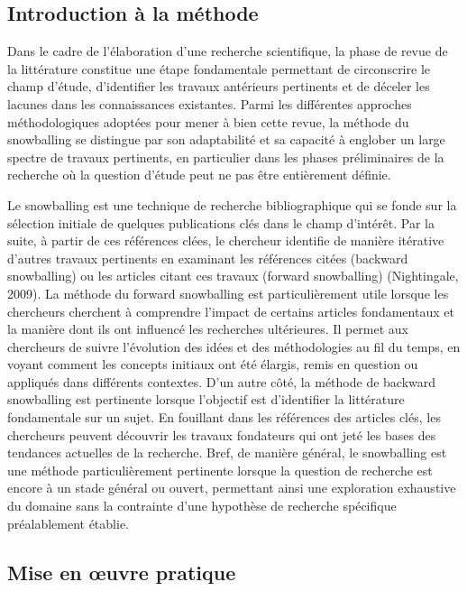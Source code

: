 \documentclass[
  letterpaper,
]{scrbook}
\begin{document}
\hypertarget{introduction-uxe0-la-muxe9thode}{%
\subsection{Introduction à la
méthode}\label{introduction-uxe0-la-muxe9thode}}

Dans le cadre de l'élaboration d'une recherche scientifique, la phase de
revue de la littérature constitue une étape fondamentale permettant de
circonscrire le champ d'étude, d'identifier les travaux antérieurs
pertinents et de déceler les lacunes dans les connaissances existantes.
Parmi les différentes approches méthodologiques adoptées pour mener à
bien cette revue, la méthode du snowballing se distingue par son
adaptabilité et sa capacité à englober un large spectre de travaux
pertinents, en particulier dans les phases préliminaires de la recherche
où la question d'étude peut ne pas être entièrement définie.

Le snowballing est une technique de recherche bibliographique qui se
fonde sur la sélection initiale de quelques publications clés dans le
champ d'intérêt. Par la suite, à partir de ces références clées, le
chercheur identifie de manière itérative d'autres travaux pertinents en
examinant les références citées (backward snowballing) ou les articles
citant ces travaux (forward snowballing) (Nightingale, 2009). La méthode
du forward snowballing est particulièrement utile lorsque les chercheurs
cherchent à comprendre l'impact de certains articles fondamentaux et la
manière dont ils ont influencé les recherches ultérieures. Il permet aux
chercheurs de suivre l'évolution des idées et des méthodologies au fil
du temps, en voyant comment les concepts initiaux ont été élargis, remis
en question ou appliqués dans différents contextes. D'un autre côté, la
méthode de backward snowballing est pertinente lorsque l'objectif est
d'identifier la littérature fondamentale sur un sujet. En fouillant dans
les références des articles clés, les chercheurs peuvent découvrir les
travaux fondateurs qui ont jeté les bases des tendances actuelles de la
recherche. Bref, de manière général, le snowballing est une méthode
particulièrement pertinente lorsque la question de recherche est encore
à un stade général ou ouvert, permettant ainsi une exploration
exhaustive du domaine sans la contrainte d'une hypothèse de recherche
spécifique préalablement établie.

\hypertarget{mise-en-ux153uvre-pratique}{%
\subsection{Mise en œuvre pratique}\label{mise-en-ux153uvre-pratique}}
\end{document}
